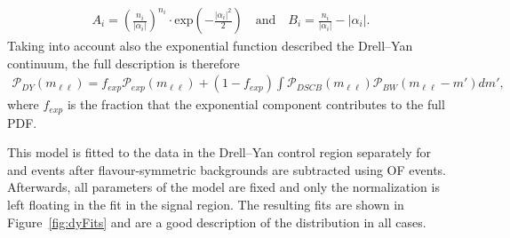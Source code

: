 \begin{eqnarray*}
A_{i} = \left(\frac{n_{i}}{|\alpha_{i}|}\right)^{n_{i}} \cdot \textrm{exp}\left(-\frac{|\alpha_{i}|^2}{2}\right) \quad \textrm{and}\quad B_{i} = \frac{n_{i}}{|\alpha_{i}|}-|\alpha_{i}| .
\end{eqnarray*}
Taking into account also the exponential function described the Drell--Yan continuum, the full description is therefore 
\begin{eqnarray*}
\mathcal{P}_{DY} (m_{\ell\ell}) = f_{exp}\mathcal{P}_{exp}(m_{\ell\ell})+(1-f_{exp})\int \mathcal{P}_{DSCB}(m_{\ell\ell})\mathcal{P}_{BW}(m_{\ell\ell}-m') dm',
\end{eqnarray*}
where $f_{exp}$ is the fraction that the exponential component contributes to the full PDF. 

This model is fitted to the data in the Drell--Yan control region separately for \EE and \MM events after flavour-symmetric backgrounds are subtracted using OF events. Afterwards, all parameters of the model are fixed and only the normalization is left floating in the fit in the signal region. The resulting fits are shown in Figure~\ref{fig:dyFits} and are a good description of the distribution in all cases. 

